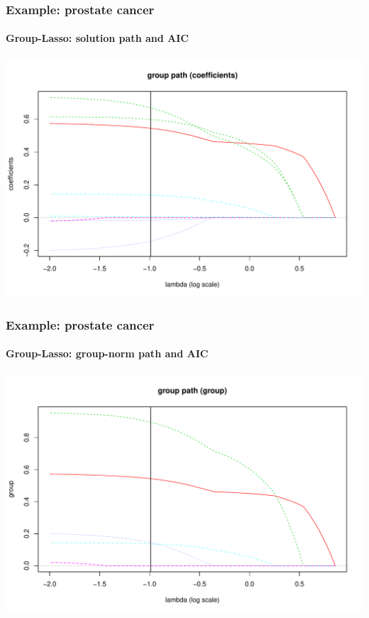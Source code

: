 \documentclass{beamer}\usepackage[]{graphicx}\usepackage[]{color}
\newenvironment{knitrout}{}{} %
\begin{document}
\begin{frame}[containsverbatim]
\frametitle{Example: prostate cancer}
\framesubtitle{Group-Lasso: solution path and AIC}

\begin{knitrout}\scriptsize
{}\color{fgcolor}
\includegraphics[width=\textwidth]{figures/varLasso-unnamed-chunk-84-1} 

\end{knitrout}

\end{frame}

\begin{frame}[containsverbatim]
\frametitle{Example: prostate cancer}
\framesubtitle{Group-Lasso: group-norm path and AIC}

\begin{knitrout}\scriptsize
{}\color{fgcolor}
\includegraphics[width=\textwidth]{figures/varLasso-unnamed-chunk-85-1} 

\end{knitrout}

\end{frame}
\end{document}
